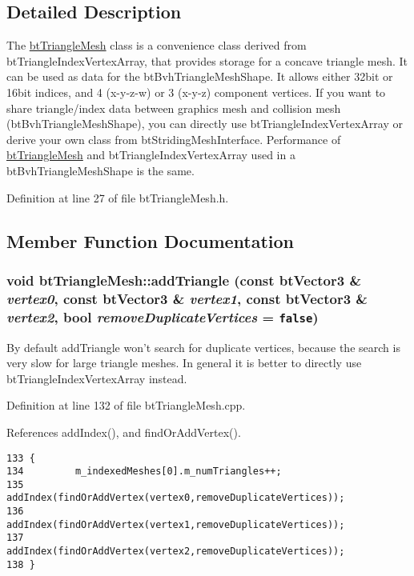 \subsection{Detailed Description}
The \hyperlink{classbt_triangle_mesh}{btTriangleMesh} class is a convenience class derived from btTriangleIndexVertexArray, that provides storage for a concave triangle mesh. It can be used as data for the btBvhTriangleMeshShape. It allows either 32bit or 16bit indices, and 4 (x-y-z-w) or 3 (x-y-z) component vertices. If you want to share triangle/index data between graphics mesh and collision mesh (btBvhTriangleMeshShape), you can directly use btTriangleIndexVertexArray or derive your own class from btStridingMeshInterface. Performance of \hyperlink{classbt_triangle_mesh}{btTriangleMesh} and btTriangleIndexVertexArray used in a btBvhTriangleMeshShape is the same. 

Definition at line 27 of file btTriangleMesh.h.

\subsection{Member Function Documentation}
\hypertarget{classbt_triangle_mesh_28551d57ae59248a210163a504558583}{
\subsubsection[addTriangle]{\setlength{\rightskip}{0pt plus 5cm}void btTriangleMesh::addTriangle (const btVector3 \& {\em vertex0}, \/  const btVector3 \& {\em vertex1}, \/  const btVector3 \& {\em vertex2}, \/  bool {\em removeDuplicateVertices} = {\tt false})}}
\label{classbt_triangle_mesh_28551d57ae59248a210163a504558583}


By default addTriangle won't search for duplicate vertices, because the search is very slow for large triangle meshes. In general it is better to directly use btTriangleIndexVertexArray instead. 

Definition at line 132 of file btTriangleMesh.cpp.

References addIndex(), and findOrAddVertex().

\begin{Code}\begin{verbatim}133 {
134         m_indexedMeshes[0].m_numTriangles++;
135         addIndex(findOrAddVertex(vertex0,removeDuplicateVertices));
136         addIndex(findOrAddVertex(vertex1,removeDuplicateVertices));
137         addIndex(findOrAddVertex(vertex2,removeDuplicateVertices));
138 }
\end{verbatim}
\end{Code}




